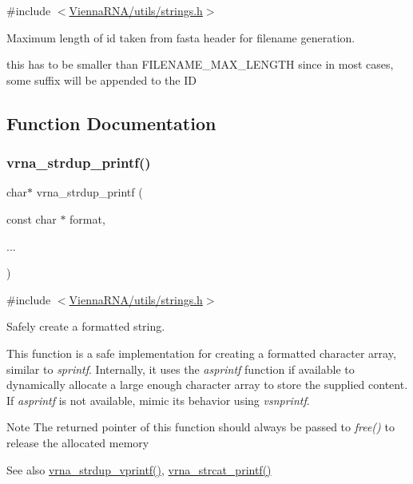 {\ttfamily \#include $<$\hyperlink{strings_8h}{Vienna\+R\+N\+A/utils/strings.\+h}$>$}



Maximum length of id taken from fasta header for filename generation. 

this has to be smaller than F\+I\+L\+E\+N\+A\+M\+E\+\_\+\+M\+A\+X\+\_\+\+L\+E\+N\+G\+TH since in most cases, some suffix will be appended to the ID 

\subsection{Function Documentation}
\mbox{\label{group__string__utils_ga33cc0190a326ec368277caa777b8bf18}} 
\subsubsection{\texorpdfstring{vrna\+\_\+strdup\+\_\+printf()}{vrna\_strdup\_printf()}}
{\footnotesize\ttfamily char$\ast$ vrna\+\_\+strdup\+\_\+printf (\begin{DoxyParamCaption}\item[{const char $\ast$}]{format,  }\item[{}]{... }\end{DoxyParamCaption})}



{\ttfamily \#include $<$\hyperlink{strings_8h}{Vienna\+R\+N\+A/utils/strings.\+h}$>$}



Safely create a formatted string. 

This function is a safe implementation for creating a formatted character array, similar to {\itshape sprintf}. Internally, it uses the {\itshape asprintf} function if available to dynamically allocate a large enough character array to store the supplied content. If {\itshape asprintf} is not available, mimic it\textquotesingle{}s behavior using {\itshape vsnprintf}.

\begin{DoxyNote}{Note}
The returned pointer of this function should always be passed to {\itshape free()} to release the allocated memory
\end{DoxyNote}
\begin{DoxySeeAlso}{See also}
\hyperlink{group__string__utils_ga459fdee190ed81bb7773cbaf671748a9}{vrna\+\_\+strdup\+\_\+vprintf()}, \hyperlink{group__string__utils_gac0771ec71316023067f2aae61a5aa0fb}{vrna\+\_\+strcat\+\_\+printf()}
\end{DoxySeeAlso}

